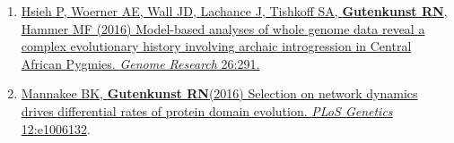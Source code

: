 \documentclass[11pt]{article}
\begin{document}
\begin{enumerate}
\item \href{http://doi.org/10.1101/gr.196634.115}{Hsieh P\trainee, Woerner AE, Wall JD, Lachance J, Tishkoff SA, \textbf{Gutenkunst RN}, Hammer MF\corresponding
(2016) Model-based analyses of whole genome data reveal a complex evolutionary history involving archaic introgression in Central African Pygmies. \emph{Genome Research} 26:291.}

\item \href{http://doi.org/10.1371/journal.pgen.1006132}{Mannakee BK\trainee, \textbf{Gutenkunst RN}\corresponding (2016) Selection on network dynamics drives differential rates of protein domain evolution. \emph{PLoS Genetics} 12:e1006132}.


\end{enumerate}
\end{document}
